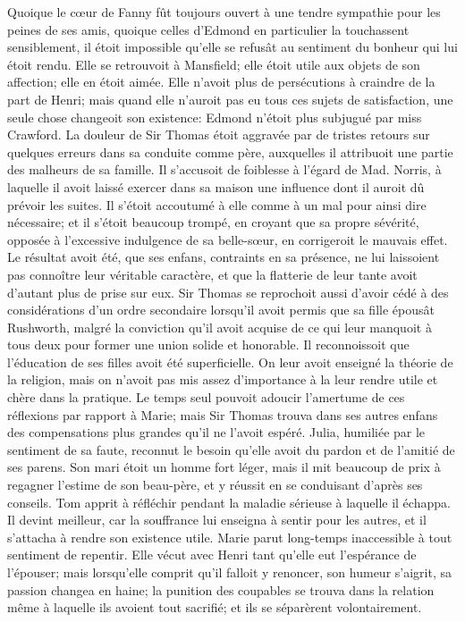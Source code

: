 Quoique le cœur de Fanny fût toujours ouvert à une tendre sympathie pour les peines de ses amis, quoique celles d'Edmond en particulier la touchassent sensiblement, il étoit impossible qu'elle se refusât au sentiment du bonheur qui lui étoit rendu.
Elle se retrouvoit à Mansfield; elle étoit utile aux objets de son affection; elle en étoit aimée. Elle n'avoit plus de persécutions à craindre de la part de Henri; mais quand elle n'auroit pas eu tous ces sujets de satisfaction, une seule chose changeoit son existence: Edmond n'étoit plus subjugué par miss Crawford.
La douleur de Sir Thomas étoit aggravée par de tristes retours sur quelques erreurs dans sa conduite comme père, auxquelles il attribuoit une partie des malheurs de sa famille. Il s'accusoit de foiblesse à l'égard de Mad. Norris, à laquelle il avoit laissé exercer dans sa maison une influence dont il auroit dû prévoir les suites. Il s'étoit accoutumé à elle comme à un mal pour ainsi dire nécessaire; et il s'étoit beaucoup trompé, en croyant que sa propre sévérité, opposée à l'excessive indulgence de sa belle-sœur,\setcounter{page}{405} en corrigeroit le mauvais effet. Le résultat avoit été, que ses enfans, contraints en sa présence, ne lui laissoient pas connoître leur véritable caractère, et que la flatterie de leur tante avoit d'autant plus de prise sur eux.
Sir Thomas se reprochoit aussi d'avoir cédé à des considérations d'un ordre secondaire lorsqu'il avoit permis que sa fille épousât Rushworth, malgré la conviction qu'il avoit acquise de ce qui leur manquoit à tous deux pour former une union solide et honorable.
Il reconnoissoit que l'éducation de ses filles avoit été superficielle. On leur avoit enseigné la théorie de la religion, mais on n'avoit pas mis assez d'importance à la leur rendre utile et chère dans la pratique. Le temps seul pouvoit adoucir l'amertume de ces réflexions par rapport à Marie; mais Sir Thomas trouva dans ses autres enfans des compensations plus grandes qu'il ne l'avoit espéré. Julia, humiliée par le sentiment de sa faute, reconnut le besoin qu'elle avoit du pardon et de l'amitié de ses parens. Son mari étoit un homme fort léger, mais il mit beaucoup de prix à regagner l'estime de son beau-père, et y réussit en se conduisant d'après ses conseils.\setcounter{page}{406} Tom apprit à réfléchir pendant la maladie sérieuse à laquelle il échappa. Il devint meilleur, car la souffrance lui enseigna à sentir pour les autres, et il s'attacha à rendre son existence utile.
Marie parut long-temps inaccessible à tout sentiment de repentir. Elle vécut avec Henri tant qu'elle eut l'espérance de l'épouser; mais lorsqu'elle comprit qu'il falloit y renoncer, son humeur s'aigrit, sa passion changea en haine; la punition des coupables se trouva dans la relation même à laquelle ils avoient tout sacrifié; et ils se séparèrent volontairement.
